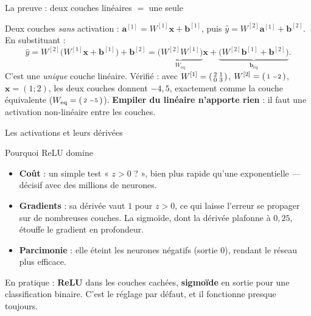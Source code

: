 \documentclass[aspectratio=169,11pt]{beamer}
\newcommand{\vx}{\mathbf{x}}
\newcommand{\va}{\mathbf{a}}
\newcommand{\vb}{\mathbf{b}}
\begin{document}
\begin{frame}{La preuve : deux couches linéaires $=$ une seule}
\begin{ucadex}
{\small Deux couches \emph{sans} activation : $\va^{[1]} = W^{[1]}\vx + \vb^{[1]}$, puis $\hat y = W^{[2]}\va^{[1]} + \vb^{[2]}$. En substituant :
\[ \hat y = W^{[2]}\big(W^{[1]}\vx + \vb^{[1]}\big) + \vb^{[2]} = \underbrace{\big(W^{[2]}W^{[1]}\big)}_{W_{\text{eq}}}\vx + \underbrace{\big(W^{[2]}\vb^{[1]} + \vb^{[2]}\big)}_{\vb_{\text{eq}}}. \]
C'est une \emph{unique} couche linéaire. Vérifié : avec $W^{[1]} = \begin{psmallmatrix} 2 & 1\\ 0 & 3 \end{psmallmatrix}$, $W^{[2]} = \begin{psmallmatrix} 1 & -2 \end{psmallmatrix}$, $\vx = (1; 2)$, les deux couches donnent $-4{,}5$, exactement comme la couche équivalente ($W_{\text{eq}} = \begin{psmallmatrix} 2 & -5 \end{psmallmatrix}$). \textbf{Empiler du linéaire n'apporte rien} : il faut une activation non-linéaire entre les couches.}
\end{ucadex}
\end{frame}

\begin{frame}{Les activations et leurs dérivées}
\end{frame}

\begin{frame}{Pourquoi ReLU domine}
\begin{ucadret}
\begin{itemize}\small
  \item \textbf{Coût} : un simple test « $z > 0$ ? », bien plus rapide qu'une exponentielle — décisif avec des millions de neurones.
  \item \textbf{Gradients} : sa dérivée vaut $1$ pour $z > 0$, ce qui laisse l'erreur se propager sur de nombreuses couches. La sigmoïde, dont la dérivée plafonne à $0{,}25$, étouffe le gradient en profondeur.
  \item \textbf{Parcimonie} : elle éteint les neurones négatifs (sortie $0$), rendant le réseau plus efficace.
\end{itemize}
\end{ucadret}
{\small En pratique : \textbf{ReLU} dans les couches cachées, \textbf{sigmoïde} en sortie pour une classification binaire. C'est le réglage par défaut, et il fonctionne presque toujours.}
\end{frame}
\end{document}
